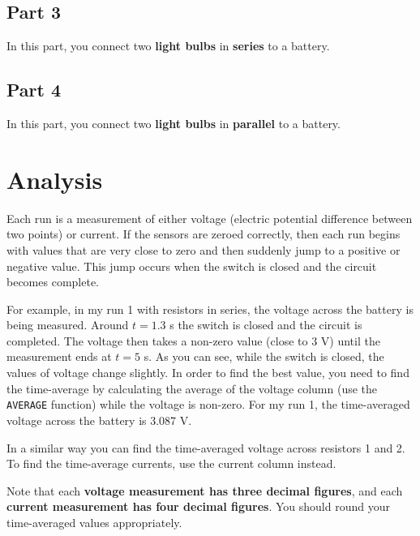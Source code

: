 \subsection{Part 3}
In this part, you connect two \textbf{light bulbs} in \textbf{series} to a battery.
\subsection{Part 4}
In this part, you connect two \textbf{light bulbs} in \textbf{parallel} to a battery.
\section{Analysis}
Each run is a measurement of either voltage (electric potential difference between two points) or current. If the sensors are zeroed correctly, then each run begins with values that are very close to zero and then suddenly jump to a positive or negative value. This jump occurs when the switch is closed and the circuit becomes complete.

For example, in my run 1 with resistors in series, the voltage across the battery is being measured. Around $t = 1.3$ s the switch is closed and the circuit is completed. The voltage then takes a non-zero value (close to 3 V) until the measurement ends at $t = 5$ s. As you can see, while the switch is closed, the values of voltage change slightly. In order to find the best value, you need to find the time-average by calculating the average of the voltage column (use the \texttt{AVERAGE} function) while the voltage is non-zero. For my run 1, the time-averaged voltage across the battery is 3.087 V.

In a similar way you can find the time-averaged voltage across resistors 1 and 2. To find the time-average currents, use the current column instead.

Note that each \textbf{voltage measurement has three decimal figures}, and each \textbf{current measurement has four decimal figures}. You should round your time-averaged values appropriately.

